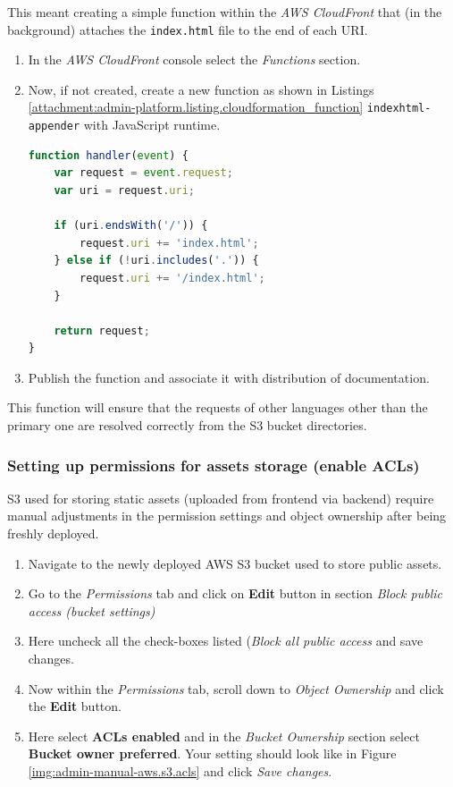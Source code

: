 This meant creating a simple function within the \textit{AWS CloudFront} that (in the background) attaches the \texttt{index.html} file to the end of each URI.

\begin{enumerate}
    \item In the \textit{AWS CloudFront} console select the \textit{Functions} section.
    \item Now, if not created, create a new function as shown in Listings \ref{attachment:admin-platform.listing.cloudformation_function} \texttt{indexhtml-appender} with JavaScript runtime.
\begin{lstlisting}[language=javascript,caption={AWS CloudFront function to  append \texttt{index.html} to each URI}]
function handler(event) {
    var request = event.request;
    var uri = request.uri;

    if (uri.endsWith('/')) {
        request.uri += 'index.html';
    } else if (!uri.includes('.')) {
        request.uri += '/index.html';
    }

    return request;
}
\end{lstlisting}
\label{attachment:admin-platform.listing.cloudformation_function}
\item Publish the function and associate it with distribution of documentation.
\end{enumerate}

This function will ensure that the requests of other languages other than the primary one are resolved correctly from the \ac{S3} bucket directories.

\subsubsection{Setting up permissions for assets storage (enable ACLs)}
\label{attachments:admin-manual-aws.s3.permissions}
\ac{S3} used for storing static assets (uploaded from frontend via backend) require manual adjustments in the permission settings and object ownership after being freshly deployed.

\begin{enumerate}
    \item Navigate to the newly deployed AWS \ac{S3} bucket used to store public assets.
    \item Go to the \textit{Permissions} tab and click on \textbf{Edit} button in section \textit{Block public access (bucket settings)}
    \item Here uncheck all the check-boxes listed (\textit{Block all public access} and save changes.
    \item Now within the \textit{Permissions} tab, scroll down to \textit{Object Ownership} and click the \textbf{Edit} button. 
    \item Here select \textbf{ACLs enabled} and in the \textit{Bucket Ownership} section select \textbf{Bucket owner preferred}. Your setting should look like in Figure \ref{img:admin-manual-aws.s3.acls} and click \textit{Save changes}.
\end{enumerate}

